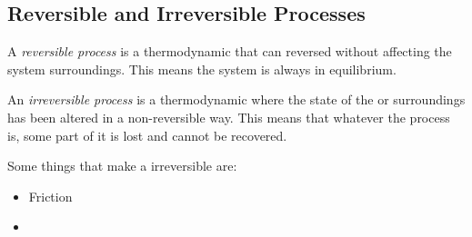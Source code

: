 \subsection{Reversible and Irreversible Processes}\label{subsec:Reversible_Irreversible_Processes}
\begin{definition}\label{def:Reversible_Process}
  A \emph{reversible process} is a thermodynamic  that can reversed without affecting the system surroundings.
  This means the system is always in equilibrium.
\end{definition}

\begin{definition}\label{def:Irreversible_Process}
  An \emph{irreversible process} is a thermodynamic  where the state of the  or surroundings has been altered in a non-reversible way.
  This means that whatever the process is, some part of it is lost and cannot be recovered.
\end{definition}

Some things that make a  irreversible are:
\begin{itemize}[noitemsep]
\item Friction
\item {}
\end{itemize}


